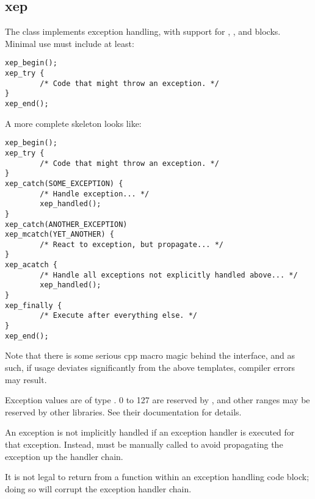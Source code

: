%
%
%
%
%              

\subsection{xep}
\label{xep}
The  class implements exception handling, with support for
, , and  blocks.
Minimal use must include at least:
\begin{verbatim}
xep_begin();
xep_try {
        /* Code that might throw an exception. */
}
xep_end();
\end{verbatim}

A more complete skeleton looks like:
\begin{verbatim}
xep_begin();
xep_try {
        /* Code that might throw an exception. */
}
xep_catch(SOME_EXCEPTION) {
        /* Handle exception... */
        xep_handled();
}
xep_catch(ANOTHER_EXCEPTION)
xep_mcatch(YET_ANOTHER) {
        /* React to exception, but propagate... */
}
xep_acatch {
        /* Handle all exceptions not explicitly handled above... */
        xep_handled();
}
xep_finally {
        /* Execute after everything else. */
}
xep_end();
\end{verbatim}

Note that there is some serious cpp macro magic behind the 
interface, and as such, if usage deviates significantly from the above
templates, compiler errors may result.

Exception values are of type .  0 to 127 are reserved by
, and other ranges may be reserved by other libraries.  See
their documentation for details.

An exception is not implicitly handled if an exception handler is executed for
that exception.  Instead,  must be manually called to
avoid propagating the exception up the handler chain.

It is not legal to return from a function within an exception handling code
block; doing so will corrupt the exception handler chain.

